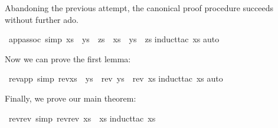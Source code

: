 \begin{isabellebody}
\isamarkuptrue%
%
\endisatagproof
{\isafoldproof}%
%
\isadelimproof
%
\endisadelimproof
%
\isamarkuptrue%
%
\begin{isamarkuptext}%
Abandoning the previous attempt, the canonical proof procedure
succeeds without further ado.%
\end{isamarkuptext}%
\isamarkuptrue%
\isamarkupfalse%
\ app{\isacharunderscore}assoc\ {\isacharbrackleft}simp{\isacharbrackright}{\isacharcolon}\ {\isachardoublequoteopen}{\isacharparenleft}xs\ {\isacharat}\ ys{\isacharparenright}\ {\isacharat}\ zs\ {\isacharequal}\ xs\ {\isacharat}\ {\isacharparenleft}ys\ {\isacharat}\ zs{\isacharparenright}{\isachardoublequoteclose}\isanewline
%
\isadelimproof
%
\endisadelimproof
%
\isatagproof
{}\isamarkupfalse%
{\isacharparenleft}induct{\isacharunderscore}tac\ xs{\isacharparenright}\isanewline
{}\isamarkupfalse%
{\isacharparenleft}auto{\isacharparenright}\isanewline
{}\isamarkupfalse%
%
\endisatagproof
{\isafoldproof}%
%
\isadelimproof
%
\endisadelimproof
%
\begin{isamarkuptext}%
\noindent
Now we can prove the first lemma:%
\end{isamarkuptext}%
\isamarkuptrue%
\isamarkupfalse%
\ rev{\isacharunderscore}app\ {\isacharbrackleft}simp{\isacharbrackright}{\isacharcolon}\ {\isachardoublequoteopen}rev{\isacharparenleft}xs\ {\isacharat}\ ys{\isacharparenright}\ {\isacharequal}\ {\isacharparenleft}rev\ ys{\isacharparenright}\ {\isacharat}\ {\isacharparenleft}rev\ xs{\isacharparenright}{\isachardoublequoteclose}\isanewline
%
\isadelimproof
%
\endisadelimproof
%
\isatagproof
{}\isamarkupfalse%
{\isacharparenleft}induct{\isacharunderscore}tac\ xs{\isacharparenright}\isanewline
{}\isamarkupfalse%
{\isacharparenleft}auto{\isacharparenright}\isanewline
{}\isamarkupfalse%
%
\endisatagproof
{\isafoldproof}%
%
\isadelimproof
%
\endisadelimproof
%
\begin{isamarkuptext}%
\noindent
Finally, we prove our main theorem:%
\end{isamarkuptext}%
\isamarkuptrue%
\isamarkupfalse%
\ rev{\isacharunderscore}rev\ {\isacharbrackleft}simp{\isacharbrackright}{\isacharcolon}\ {\isachardoublequoteopen}rev{\isacharparenleft}rev\ xs{\isacharparenright}\ {\isacharequal}\ xs{\isachardoublequoteclose}\isanewline
%
\isadelimproof
%
\endisadelimproof
%
\isatagproof
{}\isamarkupfalse%
{\isacharparenleft}induct{\isacharunderscore}tac\ xs{\isacharparenright}\isanewline

\end{isabellebody}

